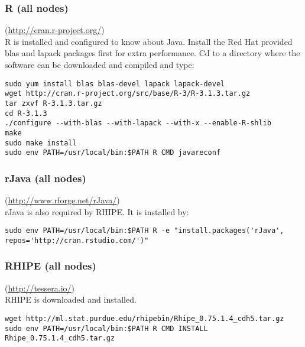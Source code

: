 \subsubsection{R (all nodes)} (\url{http://cran.r-project.org/})\\
R is installed and configured to know about Java.  Install the Red Hat
provided blas and lapack packages first for extra performance.  Cd to
a directory where the software can be downloaded and compiled and type:
\begin{verbatim}
sudo yum install blas blas-devel lapack lapack-devel
wget http://cran.r-project.org/src/base/R-3/R-3.1.3.tar.gz
tar zxvf R-3.1.3.tar.gz
cd R-3.1.3
./configure --with-blas --with-lapack --with-x --enable-R-shlib
make
sudo make install
sudo env PATH=/usr/local/bin:$PATH R CMD javareconf
\end{verbatim}

\subsubsection{rJava (all nodes)}(\url{http://www.rforge.net/rJava/})\\
rJava is also required by RHIPE.  It is installed by:

\begin{verbatim}
sudo env PATH=/usr/local/bin:$PATH R -e "install.packages('rJava', repos='http://cran.rstudio.com/')"
\end{verbatim}

\subsubsection{RHIPE (all nodes)}(\url{http://tessera.io/})\\
RHIPE is downloaded and installed.
\begin{verbatim}
wget http://ml.stat.purdue.edu/rhipebin/Rhipe_0.75.1.4_cdh5.tar.gz
sudo env PATH=/usr/local/bin:$PATH R CMD INSTALL Rhipe_0.75.1.4_cdh5.tar.gz
\end{verbatim}

